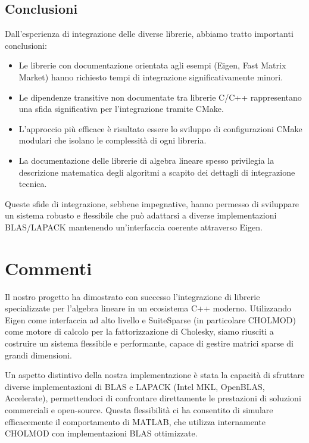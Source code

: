 \subsection{Conclusioni}

Dall'esperienza di integrazione delle diverse librerie, abbiamo tratto importanti conclusioni:

\begin{itemize}
    \item Le librerie con documentazione orientata agli esempi (Eigen, Fast Matrix Market) hanno richiesto tempi di integrazione significativamente minori.
    
    \item Le dipendenze transitive non documentate tra librerie C/C++ rappresentano una sfida significativa per l'integrazione tramite CMake.
    
    \item L'approccio più efficace è risultato essere lo sviluppo di configurazioni CMake modulari che isolano le complessità di ogni libreria.
    
    \item La documentazione delle librerie di algebra lineare spesso privilegia la descrizione matematica degli algoritmi a scapito dei dettagli di integrazione tecnica.
\end{itemize}

Queste sfide di integrazione, sebbene impegnative, hanno permesso di sviluppare un sistema robusto e flessibile che può adattarsi a diverse implementazioni BLAS/LAPACK mantenendo un'interfaccia coerente attraverso Eigen.

\section{Commenti}

Il nostro progetto ha dimostrato con successo l'integrazione di librerie specializzate per l'algebra lineare in un ecosistema C++ moderno. 
Utilizzando Eigen come interfaccia ad alto livello e SuiteSparse (in particolare CHOLMOD) come motore di calcolo per la fattorizzazione di 
Cholesky, siamo riusciti a costruire un sistema flessibile e performante, capace di gestire matrici sparse di grandi dimensioni.

Un aspetto distintivo della nostra implementazione è stata la capacità di sfruttare diverse implementazioni di BLAS e LAPACK 
(Intel MKL, OpenBLAS, Accelerate), permettendoci di confrontare direttamente le prestazioni di soluzioni commerciali e open-source. 
Questa flessibilità ci ha consentito di simulare efficacemente il comportamento di MATLAB, che utilizza internamente CHOLMOD con 
implementazioni BLAS ottimizzate.

